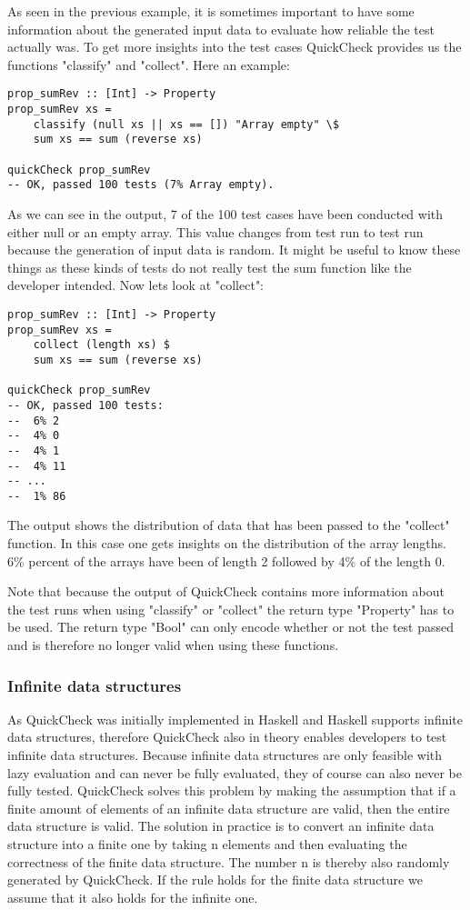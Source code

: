 \documentclass[a4paper, 12pt]{article} %
\begin{document}
As seen in the previous example, it is sometimes important to have some information about the generated input data to evaluate how reliable the test actually was. To get more insights into the test cases QuickCheck provides us the functions "classify" and "collect". \cite{Claessen2000} Here an example:

\begin{verbatim}
prop_sumRev :: [Int] -> Property
prop_sumRev xs = 
    classify (null xs || xs == []) "Array empty" \$
    sum xs == sum (reverse xs)

quickCheck prop_sumRev
-- OK, passed 100 tests (7% Array empty).
\end{verbatim}

As we can see in the output, 7 of the 100 test cases have been conducted with either null or an empty array. This value changes from test run to test run because the generation of input data is random. It might be useful to know these things as these kinds of tests do not really test the sum function like the developer intended. Now lets look at "collect":

\begin{verbatim}
prop_sumRev :: [Int] -> Property
prop_sumRev xs = 
    collect (length xs) $
    sum xs == sum (reverse xs)

quickCheck prop_sumRev
-- OK, passed 100 tests:
--  6% 2 
--  4% 0 
--  4% 1 
--  4% 11 
-- ... 
--  1% 86 
\end{verbatim}

The output shows the distribution of data that has been passed to the "collect" function. In this case one gets insights on the distribution of the array lengths. 6\% percent of the arrays have been of length 2 followed by 4\% of the length 0.

Note that because the output of QuickCheck contains more information about the test runs when using "classify" or "collect" the return type "Property" has to be used. The return type "Bool" can only encode whether or not the test passed and is therefore no longer valid when using these functions. 

\subsubsection{Infinite data structures}

As QuickCheck was initially implemented in Haskell and Haskell supports infinite data structures, therefore QuickCheck also in theory enables developers to test infinite data structures. Because infinite data structures are only feasible with lazy evaluation and can never be fully evaluated, they of course can also never be fully tested. QuickCheck solves this problem by making the assumption that if a finite amount of elements of an infinite data structure are valid, then the entire data structure is valid. The solution in practice is to convert an infinite data structure into a finite one by taking n elements and then evaluating the correctness of the finite data structure. The number n is thereby also randomly generated by QuickCheck. If the rule holds for the finite data structure we assume that it also holds for the infinite one. \cite{Claessen2000}
\end{document}
